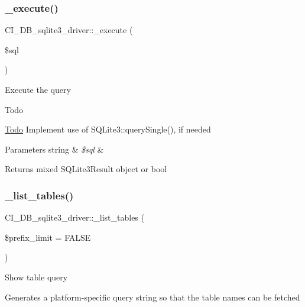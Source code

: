 \subsubsection{\texorpdfstring{\+\_\+execute()}{\_execute()}}
{\footnotesize\ttfamily C\+I\+\_\+\+D\+B\+\_\+sqlite3\+\_\+driver\+::\+\_\+execute (\begin{DoxyParamCaption}\item[{}]{\$sql }\end{DoxyParamCaption})\hspace{0.3cm}{\ttfamily [protected]}}

Execute the query

\begin{DoxyRefDesc}{Todo}
\item[\mbox{\hyperlink{todo__todo000005}{Todo}}]Implement use of S\+Q\+Lite3\+::query\+Single(), if needed \end{DoxyRefDesc}

\begin{DoxyParams}[1]{Parameters}
string & {\em \$sql} & \\
\hline
\end{DoxyParams}
\begin{DoxyReturn}{Returns}
mixed S\+Q\+Lite3\+Result object or bool 
\end{DoxyReturn}
\mbox{\label{class_c_i___d_b__sqlite3__driver_a27971cc990c48ef87823409ec0e1df51}} 
\subsubsection{\texorpdfstring{\+\_\+list\+\_\+tables()}{\_list\_tables()}}
{\footnotesize\ttfamily C\+I\+\_\+\+D\+B\+\_\+sqlite3\+\_\+driver\+::\+\_\+list\+\_\+tables (\begin{DoxyParamCaption}\item[{}]{\$prefix\+\_\+limit = {\ttfamily FALSE} }\end{DoxyParamCaption})\hspace{0.3cm}{\ttfamily [protected]}}

Show table query

Generates a platform-\/specific query string so that the table names can be fetched


